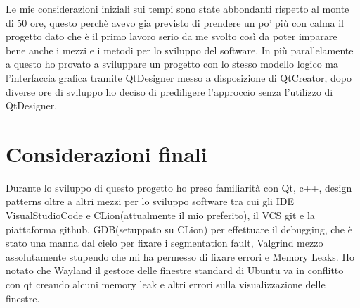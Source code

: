 \documentclass{article}
\begin{document}
Le mie considerazioni iniziali sui tempi sono state abbondanti rispetto al monte di 50 ore, questo perchè avevo gia previsto di prendere un po' più con calma il progetto dato che è il primo lavoro serio da me svolto così da poter imparare bene anche i mezzi e i metodi per lo sviluppo del software. In più parallelamente a questo ho provato a sviluppare un progetto con lo stesso modello logico ma l'interfaccia grafica tramite QtDesigner messo a disposizione di QtCreator, dopo diverse ore di sviluppo ho deciso di prediligere l'approccio senza l'utilizzo di QtDesigner.

\section{Considerazioni finali}

Durante lo sviluppo di questo progetto ho preso familiarità con Qt, c++, design patterns oltre a altri mezzi per lo sviluppo software tra cui gli IDE VisualStudioCode e CLion(attualmente il mio preferito), il VCS git e la piattaforma github, GDB(setuppato su CLion) per effettuare il debugging, che è stato una manna dal cielo per fixare i segmentation fault, Valgrind mezzo assolutamente stupendo che mi ha permesso di fixare errori e Memory Leaks. Ho notato che Wayland il gestore delle finestre standard  di Ubuntu va in conflitto con qt creando alcuni memory leak e altri errori sulla visualizzazione delle finestre.
\end{document}
